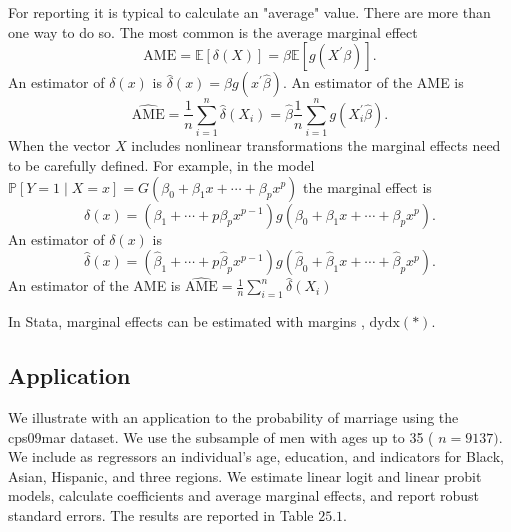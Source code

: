 \documentclass[10pt]{article}
\begin{document}
For reporting it is typical to calculate an "average" value. There are more than one way to do so. The most common is the average marginal effect
$$
\mathrm{AME}=\mathbb{E}[\delta(X)]=\beta \mathbb{E}\left[g\left(X^{\prime} \beta\right)\right] .
$$
An estimator of $\delta(x)$ is $\widehat{\delta}(x)=\widehat{\beta} g\left(x^{\prime} \widehat{\beta}\right)$. An estimator of the AME is
$$
\widehat{\mathrm{AME}}=\frac{1}{n} \sum_{i=1}^{n} \widehat{\delta}\left(X_{i}\right)=\widehat{\beta} \frac{1}{n} \sum_{i=1}^{n} g\left(X_{i}^{\prime} \widehat{\beta}\right) .
$$
When the vector $X$ includes nonlinear transformations the marginal effects need to be carefully defined. For example, in the model $\mathbb{P}[Y=1 \mid X=x]=G\left(\beta_{0}+\beta_{1} x+\cdots+\beta_{p} x^{p}\right)$ the marginal effect is
$$
\delta(x)=\left(\beta_{1}+\cdots+p \beta_{p} x^{p-1}\right) g\left(\beta_{0}+\beta_{1} x+\cdots+\beta_{p} x^{p}\right) .
$$
An estimator of $\delta(x)$ is
$$
\widehat{\delta}(x)=\left(\widehat{\beta}_{1}+\cdots+p \widehat{\beta}_{p} x^{p-1}\right) g\left(\widehat{\beta}_{0}+\widehat{\beta}_{1} x+\cdots+\widehat{\beta}_{p} x^{p}\right) .
$$
An estimator of the AME is $\widehat{\mathrm{AME}}=\frac{1}{n} \sum_{i=1}^{n} \widehat{\delta}\left(X_{i}\right)$

In Stata, marginal effects can be estimated with margins , $\mathrm{dydx}(*)$.

\subsection{Application}
We illustrate with an application to the probability of marriage using the cps09mar dataset. We use the subsample of men with ages up to 35 ( $n=9137)$. We include as regressors an individual's age, education, and indicators for Black, Asian, Hispanic, and three regions. We estimate linear logit and linear probit models, calculate coefficients and average marginal effects, and report robust standard errors. The results are reported in Table $25.1$.
\end{document}
